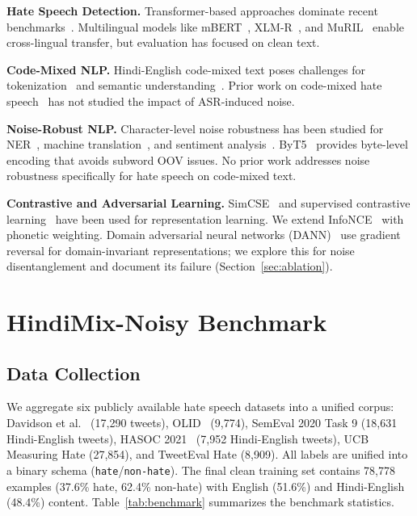 \documentclass[conference]{IEEEtran}
\begin{document}
\textbf{Hate Speech Detection.} Transformer-based approaches dominate recent benchmarks~\cite{mozafari2020bert, caselli2020hatebert}. Multilingual models like mBERT~\cite{devlin2019bert}, XLM-R~\cite{conneau2020xlmr}, and MuRIL~\cite{khanuja2021muril} enable cross-lingual transfer, but evaluation has focused on clean text.

\textbf{Code-Mixed NLP.} Hindi-English code-mixed text poses challenges for tokenization~\cite{pratapa2018language} and semantic understanding~\cite{khanuja2020gluecos}. Prior work on code-mixed hate speech~\cite{bohra2018dataset, mandl2021hasoc} has not studied the impact of ASR-induced noise.

\textbf{Noise-Robust NLP.} Character-level noise robustness has been studied for NER~\cite{piktus2019misspelling}, machine translation~\cite{belinkov2018synthetic}, and sentiment analysis~\cite{eger2019text}. ByT5~\cite{xue2022byt5} provides byte-level encoding that avoids subword OOV issues. No prior work addresses noise robustness specifically for hate speech on code-mixed text.

\textbf{Contrastive and Adversarial Learning.} SimCSE~\cite{gao2021simcse} and supervised contrastive learning~\cite{khosla2020supervised} have been used for representation learning. We extend InfoNCE~\cite{oord2018representation} with phonetic weighting. Domain adversarial neural networks (DANN)~\cite{ganin2016domain} use gradient reversal for domain-invariant representations; we explore this for noise disentanglement and document its failure (Section~\ref{sec:ablation}).

\section{HindiMix-Noisy Benchmark}
\label{sec:benchmark}

\subsection{Data Collection}

We aggregate six publicly available hate speech datasets into a unified corpus: Davidson et al.~\cite{davidson2017automated} (17,290 tweets), OLID~\cite{zampieri2019predicting} (9,774), SemEval 2020 Task 9 (18,631 Hindi-English tweets), HASOC 2021~\cite{mandl2021hasoc} (7,952 Hindi-English tweets), UCB Measuring Hate (27,854), and TweetEval Hate (8,909). All labels are unified into a binary schema (\texttt{hate}/\texttt{non-hate}). The final clean training set contains 78,778 examples (37.6\% hate, 62.4\% non-hate) with English (51.6\%) and Hindi-English (48.4\%) content. Table~\ref{tab:benchmark} summarizes the benchmark statistics.
\end{document}
